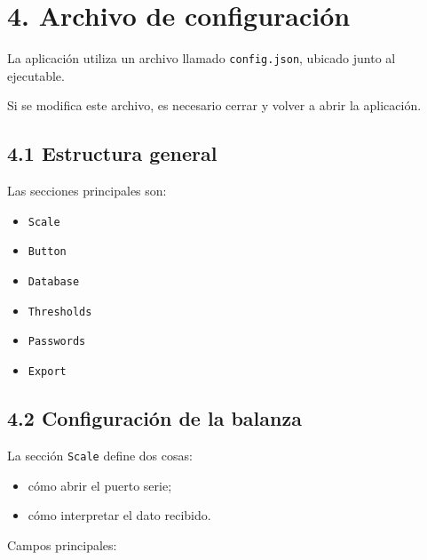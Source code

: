\documentclass[12pt,a4paper]{article}
\begin{document}
\section*{4. Archivo de configuraci\'on}

La aplicaci\'on utiliza un archivo llamado \texttt{config.json}, ubicado junto al ejecutable.

Si se modifica este archivo, es necesario cerrar y volver a abrir la aplicaci\'on.

\subsection*{4.1 Estructura general}

Las secciones principales son:

\begin{itemize}
\item \texttt{Scale}
\item \texttt{Button}
\item \texttt{Database}
\item \texttt{Thresholds}
\item \texttt{Passwords}
\item \texttt{Export}
\end{itemize}

\subsection*{4.2 Configuraci\'on de la balanza}

La secci\'on \texttt{Scale} define dos cosas:

\begin{itemize}
\item c\'omo abrir el puerto serie;
\item c\'omo interpretar el dato recibido.
\end{itemize}

Campos principales:
\end{document}
